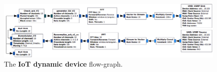 \begin{figure}[!h]
    \includegraphics[width=1.00\textwidth]{2-Chapters/4-Chapter/Images/USRP_TX_SU__v1__simple_grc.png}
    \caption{The \textbf{IoT dynamic device} flow-graph.}
    \label{fig:4app:USRP_TX_SU__v1__simple_grc}
\end{figure}